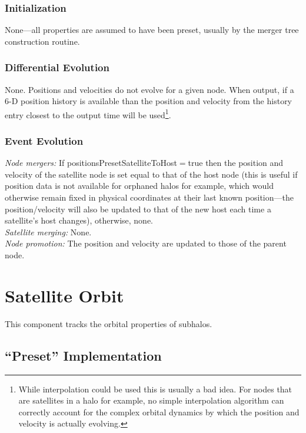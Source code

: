 \subsubsection{Initialization}

None---all properties are assumed to have been preset, usually by the merger tree construction routine.

\subsubsection{Differential Evolution}

None. Positions and velocities do not evolve for a given node. When output, if a 6-D position history is available than the position and velocity from the history entry closest to the output time will be used\footnote{While interpolation could be used this is usually a bad idea. For nodes that are satellites in a halo for example, no simple interpolation algorithm can correctly account for the complex orbital dynamics by which the position and velocity is actually evolving.}.

\subsubsection{Event Evolution}

\noindent\emph{Node mergers:} If {\normalfont \ttfamily positionsPresetSatelliteToHost}$=${\normalfont \ttfamily true} then the position and velocity of the satellite node is set equal to that of the host node (this is useful if position data is not available for orphaned halos for example, which would otherwise remain fixed in physical coordinates at their last known position---the position/velocity will also be updated to that of the new host each time a satellite's host changes), otherwise, none.\\

\noindent\emph{Satellite merging:} None.\\

\noindent\emph{Node promotion:} The position and velocity are updated to those of the parent node.\\

\section{Satellite Orbit}

This \gls{component} tracks the orbital properties of subhalos.

\subsection{``Preset'' Implementation}

